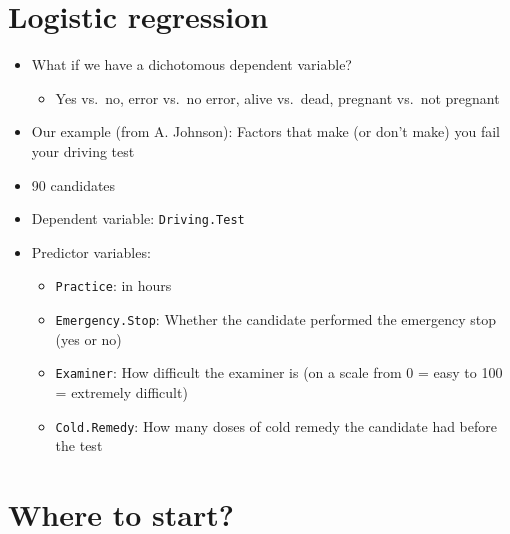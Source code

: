 \documentclass[]{article}
\begin{document}
\section{Logistic regression}\label{logistic-regression}

\begin{itemize}
\itemsep1pt\parskip0pt
\item
  What if we have a dichotomous dependent variable?

  \begin{itemize}
  \itemsep1pt\parskip0pt
  \item
    Yes vs.~no, error vs.~no error, alive vs.~dead, pregnant vs.~not
    pregnant
  \end{itemize}
\item
  Our example (from A. Johnson): Factors that make (or don't make) you
  fail your driving test
\item
  90 candidates
\item
  Dependent variable: \texttt{Driving.Test}
\item
  Predictor variables:

  \begin{itemize}
  \itemsep1pt\parskip0pt
  \item
    \texttt{Practice}: in hours
  \item
    \texttt{Emergency.Stop}: Whether the candidate performed the
    emergency stop (yes or no)
  \item
    \texttt{Examiner}: How difficult the examiner is (on a scale from 0
    = easy to 100 = extremely difficult)
  \item
    \texttt{Cold.Remedy}: How many doses of cold remedy the candidate
    had before the test
  \end{itemize}
\end{itemize}

\section{Where to start?}\label{where-to-start}
\end{document}
